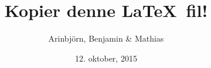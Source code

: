 \documentclass[]{article} %
\begin{document}
\title{Kopier denne \LaTeX ~fil!}
\author{Arinbjörn, Benjamin \& Mathias}
\date{12. oktober, 2015}

\maketitle
\end{document}
